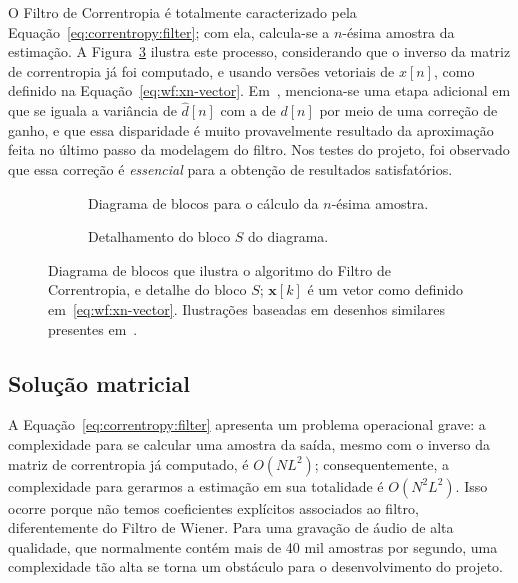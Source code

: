 O Filtro de Correntropia é totalmente caracterizado pela Equação~\eqref{eq:correntropy:filter}; com ela, calcula-se a $n$-ésima amostra da estimação. A Figura~\ref{fig:correntropy:filter} ilustra este processo, considerando que o inverso da matriz de correntropia já foi computado, e usando versões vetoriais de $x[n]$, como definido na Equação~\eqref{eq:wf:xn-vector}. Em~\cite{pokharel-2006, pokharel-2007}, menciona-se uma etapa adicional em que se iguala a variância de $\hat{d}[n]$ com a de $d[n]$ por meio de uma correção de ganho, e que essa disparidade é muito provavelmente resultado da aproximação feita no último passo da modelagem do filtro. Nos testes do projeto, foi observado que essa correção é \emph{essencial} para a obtenção de resultados satisfatórios.
\begin{figure}[!ht]
    \centering
     \begin{subfigure}[t]{\textwidth}
        \centering
        
        \caption{Diagrama de blocos para o cálculo da $n$-ésima amostra.}
        \label{fig:correntropy:block-diagram}
    \end{subfigure}

    \bigskip\medskip

    \begin{subfigure}[t]{\textwidth}
        \centering
        
        \caption{Detalhamento do bloco $S$ do diagrama.}
        \label{fig:correntropy:sigma-specification}
    \end{subfigure}

    \caption[Diagrama de blocos do Filtro de Correntropia]{Diagrama de blocos que ilustra o algoritmo do Filtro de Correntropia, e detalhe do bloco $S$; $\mathbf{x}[k]$ é um vetor como definido em~\eqref{eq:wf:xn-vector}. Ilustrações baseadas em desenhos similares presentes em~\cite{pokharel-2007}.}
    \label{fig:correntropy:filter}
\end{figure}

\subsection{Solução matricial}

A Equação~\eqref{eq:correntropy:filter} apresenta um problema operacional grave: a complexidade para se calcular uma amostra da saída, mesmo com o inverso da matriz de correntropia já computado, é $O(N L^2)$; consequentemente, a complexidade para gerarmos a estimação em sua totalidade é $O(N^2 L^2)$. Isso ocorre porque não temos coeficientes explícitos associados ao filtro, diferentemente do Filtro de Wiener. Para uma gravação de áudio de alta qualidade, que normalmente contém mais de 40 mil amostras por segundo, uma complexidade tão alta se torna um obstáculo para o desenvolvimento do projeto.

